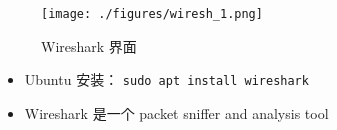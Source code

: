
\begin{issues}
\issueDraft
\end{issues}

\begin{figure}[ht]
\centering
\texttt{[image: ./figures/wiresh\_1.png]}
\caption{Wireshark 界面} \label{wiresh_fig1}
\end{figure}

\begin{itemize}
\item Ubuntu 安装： \verb|sudo apt install wireshark|
\item Wireshark 是一个 packet sniffer and analysis tool
\end{itemize}
